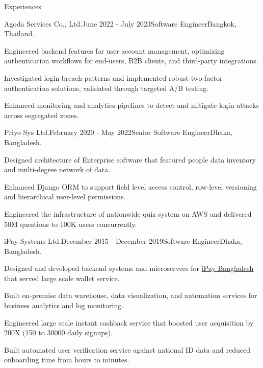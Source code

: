 
\begin{rSection}{Experiences}
    \begin{rSubsection}{Agoda Services Co., Ltd.}{June 2022 - July 2023}{Software Engineer}{Bangkok, Thailand.}
        \item Engineered backend features for user account management, optimizing authentication workflows for end-users, B2B clients, and third-party integrations.
        \item Investigated login breach patterns and implemented robust two-factor authentication solutions, validated through targeted A/B testing.
        \item Enhanced monitoring and analytics pipelines to detect and mitigate login attacks across segregated zones.
    \end{rSubsection}

    \begin{rSubsection}{Priyo Sys Ltd.}{February 2020 - May 2022}{Senior Software Engineer}{Dhaka, Bangladesh.}
        \item Designed architecture of Enterprise software that featured people data inventory and multi-degree network of data.
        \item Enhanced Django ORM to support field level access control, row-level versioning and hierarchical user-level permissions.
        \item Engineered the infrastructure of nationwide quiz system on AWS and delivered 50M questions to 100K users concurrently.
    \end{rSubsection}


    \begin{rSubsection}{iPay Systems Ltd.}{December 2015 - December 2019}{Software Engineer}{Dhaka, Bangladesh.}
        \item Designed and developed backend systems and microservces for \href{https://www.ipay.com.bd/}{iPay Bangladesh} that served large scale wallet service.
        \item Built on-premise data warehouse, data visualization, and automation services for business analytics and log monitoring.
        \item Engineered large scale instant cashback service that boosted user acquisition by 200X (150 to 30000 daily signups).
        \item Built automated user verification service against national ID data and reduced onboarding time from hours to minutes.
    \end{rSubsection}

\end{rSection}